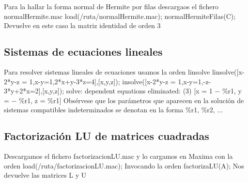 \documentclass[a4paper, 12pt] {article}
\begin{document}
Para la hallar la forma normal de Hermite por filas descargaos el fichero normalHermite.mac
load(/ruta/normalHermite.mac);
normalHermiteFilas(C);
Devuelve en este caso la matriz identidad de orden 3

\subsection{Sistemas de ecuaciones lineales}
Para resolver sistemas lineales de ecuaciones usamos la orden linsolve
linsolve([x-2*y-z = 1,x-y=1,2*x+y-3*z=4],[x,y,z]);
insolve([x-2*y-z = 1,x-y=1,-z-3*y+2*x=2],[x,y,z]);
solve: dependent equations eliminated: (3)
[x = 1 − \%r1, y = − \%r1, z = \%r1]
Obsérvese que los parámetros que aparecen en la solución de sistemas compatibles indeterminados se
denotan en la forma \%r1, \%r2, ...

\subsection{Factorización LU de matrices cuadradas}
Descargamos el fichero factorizacionLU.mac y lo cargamos en Maxima con la orden
load(/ruta/factorizacionLU.mac);
Invocando la orden
factorizaLU(A);
Nos devuelve las matrices L y U
\end{document}

